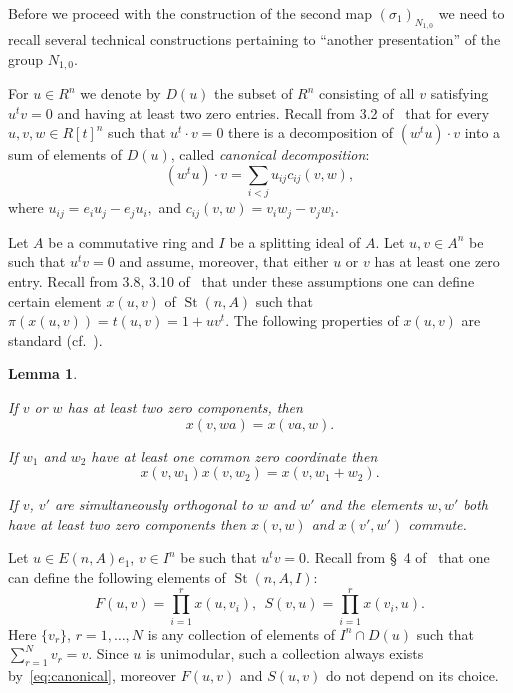 \documentclass[oneside, 10pt]{amsart}
\DeclareMathOperator{\St}{St}
\numberwithin{equation}{section}
\newtheorem{lemma}{Lemma}
\numberwithin{lemma}{section}
\theoremstyle{definition}
\theoremstyle{remark}
\begin{document}
Before we proceed with the construction of the second map $(\sigma_1)_{N_{1,0}}$ we need to recall several technical
 constructions pertaining to ``another presentation'' of the group $N_{1,0}$.

For $u \in R^n$ we denote by $D(u)$ the subset of $R^n$ consisting of all $v$ satisfying $u^tv = 0$ and having at least two zero entries.
Recall from 3.2 of~\cite{Ka77} that for every $u, v, w \in R[t]^n$ such that $u^t \cdot v = 0$ there
 is a decomposition of $(w^t u) \cdot v$ into a sum of elements of $D(u)$, called {\it canonical decomposition}:
\setcounter{equation}{1}
\renewcommand{\theequation}{\arabic{equation}}
\begin{equation} \label{eq:canonical} (w^tu) \cdot v=\sum_{i<j}u_{ij} c_{ij}(v, w),\end{equation}
where $u_{ij}=e_iu_j-e_ju_i,$ and $c_{ij}(v, w)=v_iw_j-v_jw_i.$

Let $A$ be a commutative ring and $I$ be a splitting ideal of $A$.
Let $u, v \in A^n$ be such that $u^t v = 0$ and assume, moreover, that either $u$ or $v$ has at least one zero entry.
Recall from 3.8, 3.10 of~\cite{Ka77} that under these assumptions one can define certain element
 $x(u, v)$ of $\St(n, A)$ such that $\pi(x(u, v)) = t(u, v) = 1 + uv^t$.
The following properties of $x(u, v)$ are standard (cf.~\cite[Lemma~1.1]{Tu83}).
\begin{lemma} \label{lem:xsmall-properties}
\begin{lemlist}
 \item \label{item:xsmall-scalar} If $v$ or $w$ has at least two zero components, then 
 \begin{equation}\nonumber x(v, wa) = x(va, w).\end{equation}
 \item \label{item:xsmall-additivity} If $w_1$ and $w_2$ have at least one common zero coordinate then
 \begin{equation}\nonumber x(v, w_1)x(v, w_2) = x(v, w_1+w_2).\end{equation}
 \item \label{item:xsmall-commute} If $v$, $v'$ are simultaneously orthogonal to $w$ and $w'$ and the elements $w, w'$
  both have at least two zero components then $x(v, w)$ and $x(v', w')$ commute.
\end{lemlist}
\end{lemma}

Let $u \in E(n, A)e_1$, $v \in I^n$ be such that $u^tv = 0$.
Recall from \S~4 of~\cite{LS17} that one can define the following elements of $\St(n, A, I)$:
\begin{equation} \label{eq:sigma-definition}
 F(u, v) = \prod\limits_{i=1}^r x(u,  v_i),\ \
 S(v, u) = \prod\limits_{i=1}^r x( v_i, u).
\end{equation}
Here $\{v_r\}$, $r=1,\ldots,N$ is any collection of elements of $I^n \cap D(u)$ such that $\sum_{r=1}^N v_r = v$.
Since $u$ is unimodular, such a collection always exists by~\eqref{eq:canonical}, moreover
 $F(u, v)$ and $S(u, v)$ do not depend on its choice. %
\end{document}
